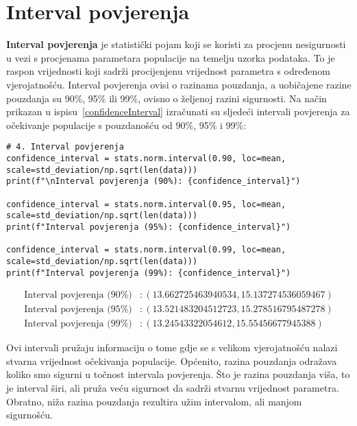 \section{Interval povjerenja}

\textbf{Interval povjerenja} je statistički pojam koji se koristi za procjenu nesigurnosti u vezi s procjenama parametara populacije na temelju uzorka podataka. To je raspon vrijednosti koji sadrži procijenjenu vrijednost parametra s određenom vjerojatnošću. Interval povjerenja ovisi o razinama pouzdanja, a uobičajene razine pouzdanja su 90\%, 95\% ili 99\%, ovisno o željenoj razini sigurnosti. Na način prikazan u ispisu~\ref{confidenceInterval} izračunati su sljedeći intervali povjerenja za očekivanje populacije s pouzdanošću od 90\%, 95\% i 99\%:

\begin{lstlisting}[caption={Izračun intervala povjerenja (90\%, 95\% i 99\%)}, label=confidenceInterval]
# 4. Interval povjerenja
confidence_interval = stats.norm.interval(0.90, loc=mean, scale=std_deviation/np.sqrt(len(data)))
print(f"\nInterval povjerenja (90%): {confidence_interval}")

confidence_interval = stats.norm.interval(0.95, loc=mean, scale=std_deviation/np.sqrt(len(data)))
print(f"Interval povjerenja (95%): {confidence_interval}")

confidence_interval = stats.norm.interval(0.99, loc=mean, scale=std_deviation/np.sqrt(len(data)))
print(f"Interval povjerenja (99%): {confidence_interval}")
\end{lstlisting}

\[
\begin{aligned}
\text{Interval povjerenja (90\%)} &: (13.662725463940534, 15.137274536059467) \\
\text{Interval povjerenja (95\%)} &: (13.521483204512723, 15.278516795487278) \\
\text{Interval povjerenja (99\%)} &: (13.24543322054612, 15.55456677945388)
\end{aligned}
\]

Ovi intervali pružaju informaciju o tome gdje se s velikom vjerojatnošću nalazi stvarna vrijednost očekivanja populacije. Općenito, razina pouzdanja odražava koliko smo sigurni u točnost intervala povjerenja. Što je razina pouzdanja viša, to je interval širi, ali pruža veću sigurnost da sadrži stvarnu vrijednost parametra. Obratno, niža razina pouzdanja rezultira užim intervalom, ali manjom sigurnošću.